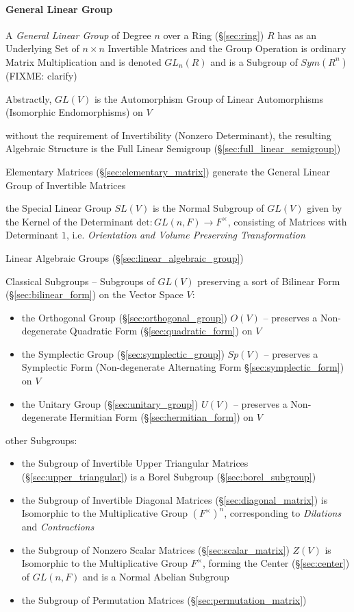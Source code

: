 \paragraph{General Linear Group}\label{sec:general_linear_group}\hfill

A \emph{General Linear Group} of Degree $n$ over a Ring (\S\ref{sec:ring}) $R$
has as an Underlying Set of $n \times n$ Invertible Matrices and the Group
Operation is ordinary Matrix Multiplication and is denoted $GL_n(R)$ and is a
Subgroup of $Sym(R^n)$ (FIXME: clarify)

Abstractly, $GL(V)$ is the Automorphism Group of Linear Automorphisms
(Isomorphic Endomorphisms) on $V$

without the requirement of Invertibility (Nonzero Determinant), the resulting
Algebraic Structure is the Full Linear Semigroup
(\S\ref{sec:full_linear_semigroup})

Elementary Matrices (\S\ref{sec:elementary_matrix}) generate the General Linear
Group of Invertible Matrices

the Special Linear Group $SL(V)$ is the Normal Subgroup of $GL(V)$ given by the
Kernel of the Determinant $\mathrm{det} : GL(n,F) \rightarrow F^\times$,
consisting of Matrices with Determinant $1$, i.e. \emph{Orientation and Volume
  Preserving Transformation}

\fist Linear Algebraic Groups (\S\ref{sec:linear_algebraic_group})

Classical Subgroups -- Subgroups of $GL(V)$ preserving a sort of Bilinear Form
(\S\ref{sec:bilinear_form}) on the Vector Space $V$:
\begin{itemize}
  \item the Orthogonal Group (\S\ref{sec:orthogonal_group}) $O(V)$ -- preserves
    a Non-degenerate Quadratic Form (\S\ref{sec:quadratic_form}) on $V$
  \item the Symplectic Group (\S\ref{sec:symplectic_group}) $Sp(V)$
    -- preserves a Symplectic Form (Non-degenerate Alternating Form
    \S\ref{sec:symplectic_form}) on $V$
  \item the Unitary Group (\S\ref{sec:unitary_group}) $U(V)$
    -- preserves a Non-degenerate Hermitian Form (\S\ref{sec:hermitian_form})
    on $V$
\end{itemize}

other Subgroups:
\begin{itemize}
  \item the Subgroup of Invertible Upper Triangular Matrices
    (\S\ref{sec:upper_triangular}) is a Borel Subgroup
    (\S\ref{sec:borel_subgroup})
  \item the Subgroup of Invertible Diagonal Matrices
    (\S\ref{sec:diagonal_matrix}) is Isomorphic to the Multiplicative Group
    $(F^\times)^n$, corresponding to \emph{Dilations} and \emph{Contractions}
  \item the Subgroup of Nonzero Scalar Matrices (\S\ref{sec:scalar_matrix})
    $Z(V)$ is Isomorphic to the Multiplicative Group $F^\times$, forming the
    Center (\S\ref{sec:center}) of $GL(n,F)$ and is a Normal Abelian Subgroup
  \item the Subgroup of Permutation Matrices (\S\ref{sec:permutation_matrix})
\end{itemize}

